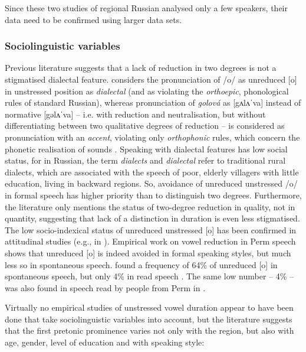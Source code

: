 \documentclass[output=paper]{langscibook}
\begin{document}
Since these two studies of regional Russian analysed only a few speakers, their data need to be confirmed using larger data sets.


\subsubsection{Sociolinguistic variables}
\label{sec:post:1.2.4}
Previous literature suggests that a lack of reduction in two degrees is not a stigmatised dialectal feature. \citet{Bondarko1998} considers the pronunciation of \mbox{/o/} as unreduced [o] in unstressed position as \textit{dialectal} (and as violating the \textit{orthoepic}, phonological rules of standard Russian), whereas pronunciation of \textit{golová} as [gʌlʌˈva] instead of normative [gəlʌˈva] -- i.e. with reduction and neutralisation, but without differentiating between two qualitative degrees of reduction -- is considered as pronunciation with an \textit{accent}, violating only \textit{orthophonic} rules, which concern the phonetic realisation of sounds \citep[249]{Bondarko1998}. Speaking with dialectal features has low social status, for in Russian, the term \textit{dialects} and \textit{dialectal} refer to traditional rural dialects, which are associated with the speech of poor, elderly villagers with little education, living in backward regions. So, avoidance of unreduced unstressed \mbox{/o/} in formal speech has higher priority than to distinguish two degrees. Furthermore, the literature only mentions the status of two-degree reduction in quality, not in quantity, suggesting that lack of a distinction in duration is even less stigmatised. The low socio-indexical status of unreduced unstressed [o] has been confirmed in attitudinal studies (e.g., in \citealt{Andrews1995}). Empirical work on vowel reduction in Perm speech shows that unreduced [o] is indeed avoided in formal speaking styles, but much less so in spontaneous speech. \citet{Erofeeva1993} found a frequency of 64\% of unreduced [o] in spontaneous speech, but only 4\% in read speech \citep{Erofeeva1993}. The same low number -- 4\% -- was also found in speech read by people from Perm in \citet{VerbickajaEtAl1984}.



Virtually no empirical studies of unstressed vowel duration appear to have been done that take sociolinguistic variables into account, but the literature suggests that the first pretonic prominence varies not only with the region, but also with age, gender, level of education and with speaking style:
\end{document}
